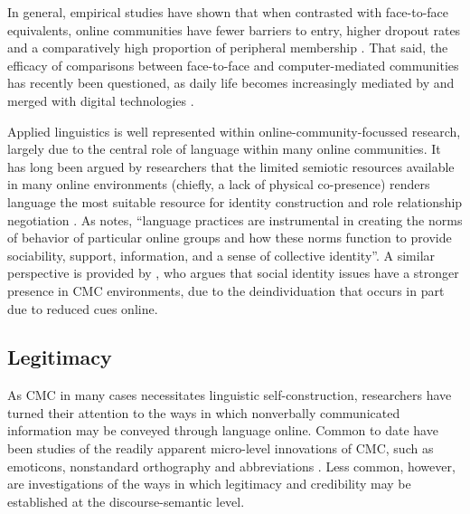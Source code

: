 	  In general, empirical studies have shown that when contrasted with face-to-face equivalents, online communities have fewer barriers to entry, higher dropout rates and a comparatively high proportion of peripheral membership \cite{zhang_peripheral_2001}. That said, the efficacy of comparisons between face-to-face and computer-mediated communities has recently been questioned, as daily life becomes increasingly mediated by and merged with digital technologies \cite{wu_is_2013}.  %

	  Applied linguistics is well represented within online-community-focussed research, largely due to the central role of language within many online communities. It has long been argued  by researchers that the limited semiotic resources available in many online environments (chiefly, a lack of physical co-presence) renders language the most suitable resource for identity construction and role relationship negotiation \cite{thorne_computer-mediated_2008}. As \textcite[p.~303]{lam_language_2008} notes, ``language practices are instrumental in creating the norms of behavior of particular online groups and how these norms function to provide sociability, support, information, and a sense of collective identity''. A similar perspective is provided by \textcite{postmes_formation_2000}, who argues that social identity issues have a stronger presence in CMC environments, due to the deindividuation that occurs in part due to reduced cues online.

	  \subsection{Legitimacy}


		 As CMC in many cases necessitates linguistic self-construction, researchers have turned their attention to the ways in which nonverbally communicated information may be conveyed through language online. Common to date have been studies of the readily apparent micro-level innovations of CMC, such as emoticons, nonstandard orthography and abbreviations \cite{dresner_functions_2010}. Less common, however, are investigations of the ways in which legitimacy and credibility may be established at the discourse-semantic level.

